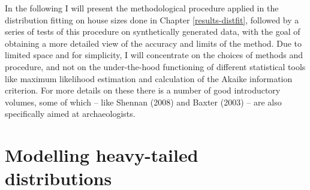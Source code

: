 \documentclass[
  12pt,
  a4paper, twoside]{book}
\begin{document}
In the following I will present the methodological procedure applied in the distribution fitting on house sizes done in Chapter \ref{results-distfit}, followed by a series of tests of this procedure on synthetically generated data, with the goal of obtaining a more detailed view of the accuracy and limits of the method. Due to limited space and for simplicity, I will concentrate on the choices of methods and procedure, and not on the under-the-hood functioning of different statistical tools like maximum likelihood estimation and calculation of the Akaike information criterion. For more details on these there is a number of good introductory volumes, some of which -- like Shennan (2008) and Baxter (2003) -- are also specifically aimed at archaeologists.

\hypertarget{modelling-heavy-tailed-distributions}{%
\section{Modelling heavy-tailed distributions}\label{modelling-heavy-tailed-distributions}}
\end{document}
